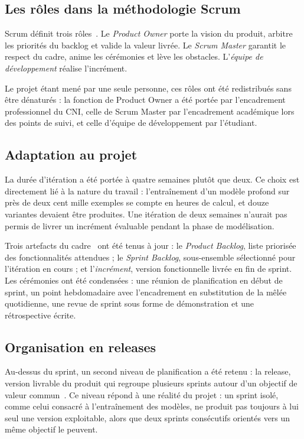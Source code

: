 \subsection{Les rôles dans la méthodologie Scrum}

Scrum définit trois rôles~\cite{schwaber2020}. Le \emph{Product Owner} porte la vision du produit, arbitre
les priorités du backlog et valide la valeur livrée. Le \emph{Scrum Master} garantit le
respect du cadre, anime les cérémonies et lève les obstacles. L'\emph{équipe de
développement} réalise l'incrément.

Le projet étant mené par une seule personne, ces rôles ont été redistribués sans être
dénaturés : la fonction de Product Owner a été portée par l'encadrement professionnel du
CNI, celle de Scrum Master par l'encadrement académique lors des points de suivi, et
celle d'équipe de développement par l'étudiant.

\subsection{Adaptation au projet}

La durée d'itération a été portée à quatre semaines plutôt que deux. Ce choix est
directement lié à la nature du travail : l'entraînement d'un modèle profond sur près de
deux cent mille exemples se compte en heures de calcul, et douze variantes devaient être
produites. Une itération de deux semaines n'aurait pas permis de livrer un incrément
évaluable pendant la phase de modélisation.

Trois artefacts du cadre~\cite{schwaber2020} ont été tenus à jour : le \emph{Product
Backlog}, liste priorisée des
fonctionnalités attendues ; le \emph{Sprint Backlog}, sous-ensemble sélectionné pour
l'itération en cours ; et l'\emph{incrément}, version fonctionnelle livrée en fin de
sprint. Les cérémonies ont été condensées : une réunion de planification en début de
sprint, un point hebdomadaire avec l'encadrement en substitution de la mêlée
quotidienne, une revue de sprint sous forme de démonstration et une rétrospective
écrite.

\subsection{Organisation en releases}

Au-dessus du sprint, un second niveau de planification a été retenu : la
release, version livrable du produit qui regroupe plusieurs sprints autour d'un
objectif de valeur commun~\cite{cohn2005}. Ce niveau répond à une réalité du projet : un sprint isolé,
comme celui consacré à l'entraînement des modèles, ne produit pas toujours à lui seul une
version exploitable, alors que deux sprints consécutifs orientés vers un même objectif le
peuvent.


